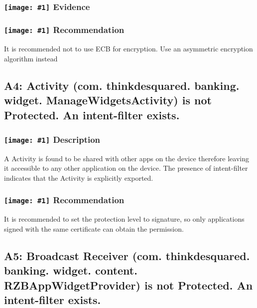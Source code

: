 \documentclass[12p]{article}
\newcommand{\icon}[1]{\texttt{[image: \#1]}}
\begin{document}
\subsubsection*{\protect\icon{/home/miki/Documents/GITHUB/AndroidPermissions/python/vulns/report_icons/basic_magnifier.png} Evidence}


\subsubsection*{\protect\icon{/home/miki/Documents/GITHUB/AndroidPermissions/python/vulns/report_icons/basic_todo.png} Recommendation}
It is recommended not to use ECB for encryption. Use an asymmetric encryption algorithm instead
\subsection{A4: Activity (com. thinkdesquared. banking. widget. ManageWidgetsActivity) is not Protected. An intent-filter exists.}
\subsubsection*{\protect\icon{/home/miki/Documents/GITHUB/AndroidPermissions/python/vulns/report_icons/basic_sheet.png} Description}
A  Activity is found to be shared with other apps on the device therefore leaving it accessible to any other application on the device. The presence of intent-filter indicates that the Activity is explicitly exported.
\subsubsection*{\protect\icon{/home/miki/Documents/GITHUB/AndroidPermissions/python/vulns/report_icons/basic_todo.png} Recommendation}
It is recommended to set the protection level to signature, so only applications signed with the same certificate can obtain the permission.
\subsection{A5: Broadcast Receiver (com. thinkdesquared. banking. widget. content. RZBAppWidgetProvider) is not Protected. An intent-filter exists.}
\end{document}
